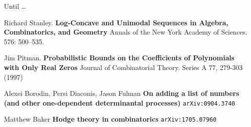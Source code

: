 \documentclass[12pt]{article}
\begin{document}
\newpage

\noindent Until \dots 

\vfill


\noindent 

\begin{thebibliography}{}

\item Richard Stanley.  \textbf{Log-Concave and Unimodal Sequences in Algebra, Combinatorics, and Geometry} Annals of the New York Academy of Sciences. 576: 500–535. 

\item Jim Pitman. \textbf{Probabilistic Bounds on the Coefficients of
Polynomials with Only Real Zeros} Journal of Combinatorial Theory. Series A 77, 279-303 (1997)

\item Alexei Borodin, Persi Diaconis, Jason Fulman \textbf{On adding a list of numbers (and other one-dependent determinantal processes)} \texttt{arXiv:0904.3740}
\item Matthew Baker \textbf{Hodge theory in combinatorics} \texttt{arXiv:1705.07960}


\end{thebibliography}
\end{document}
